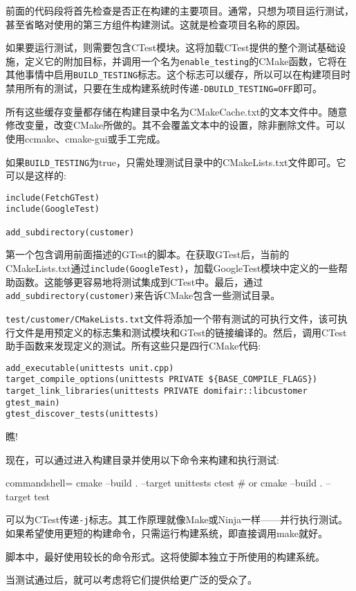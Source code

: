 前面的代码段将首先检查是否正在构建的主要项目。通常，只想为项目运行测试，甚至省略对使用的第三方组件构建测试。这就是检查项目名称的原因。

如果要运行测试，则需要包含CTest模块。这将加载CTest提供的整个测试基础设施，定义它的附加目标，并调用一个名为\texttt{enable\_testing}的CMake函数，它将在其他事情中启用\texttt{BUILD\_TESTING}标志。这个标志可以缓存，所以可以在构建项目时禁用所有的测试，只要在生成构建系统时传递\texttt{-DBUILD\_TESTING=OFF}即可。

所有这些缓存变量都存储在构建目录中名为CMakeCache.txt的文本文件中。随意修改变量，改变CMake所做的。其不会覆盖文本中的设置，除非删除文件。可以使用ccmake、cmake-gui或手工完成。

如果\texttt{BUILD\_TESTING}为true，只需处理测试目录中的CMakeLists.txt文件即可。它可以是这样的:

\begin{lstlisting}[style=styleCMake]
include(FetchGTest)
include(GoogleTest)

add_subdirectory(customer)
\end{lstlisting}

第一个包含调用前面描述的GTest的脚本。在获取GTest后，当前的CMakeLists.txt通过\texttt{include(GoogleTest)}，加载GoogleTest模块中定义的一些帮助函数。这能够更容易地将测试集成到CTest中。最后，通过\texttt{add\_subdirectory(customer)}来告诉CMake包含一些测试目录。

\texttt{test/customer/CMakeLists.txt}文件将添加一个带有测试的可执行文件，该可执行文件是用预定义的标志集和测试模块和GTest的链接编译的。然后，调用CTest助手函数来发现定义的测试。所有这些只是四行CMake代码:

\begin{lstlisting}[style=styleCMake]
add_executable(unittests unit.cpp)
target_compile_options(unittests PRIVATE ${BASE_COMPILE_FLAGS})
target_link_libraries(unittests PRIVATE domifair::libcustomer gtest_main)
gtest_discover_tests(unittests)
\end{lstlisting}

瞧!

现在，可以通过进入构建目录并使用以下命令来构建和执行测试:

\begin{tcblisting}{commandshell={}}
cmake --build . --target unittests
ctest # or cmake --build . --target test
\end{tcblisting}

可以为CTest传递\texttt{-j}标志。其工作原理就像Make或Ninja一样——并行执行测试。如果希望使用更短的构建命令，只需运行构建系统，即直接调用make就好。

\begin{tcolorbox}[colback=blue!5!white,colframe=blue!75!black, title=Note]
\hspace*{0.7cm}脚本中，最好使用较长的命令形式。这将使脚本独立于所使用的构建系统。
\end{tcolorbox}

当测试通过后，就可以考虑将它们提供给更广泛的受众了。






